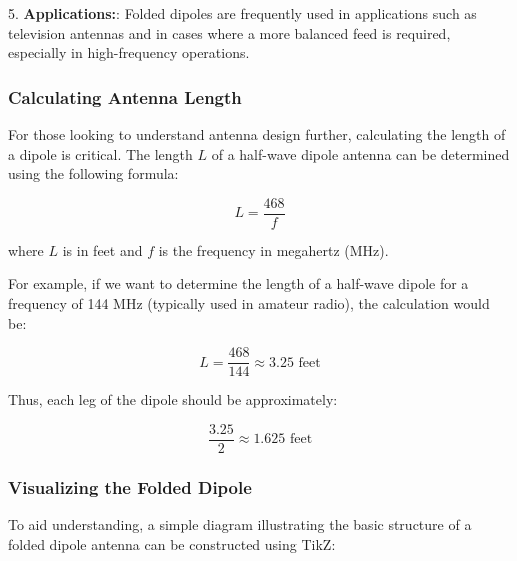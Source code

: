 5. \textbf{Applications:}: Folded dipoles are frequently used in applications such as television antennas and in cases where a more balanced feed is required, especially in high-frequency operations.

\subsubsection{Calculating Antenna Length}

For those looking to understand antenna design further, calculating the length of a dipole is critical. The length \( L \) of a half-wave dipole antenna can be determined using the following formula:

\[
L = \frac{468}{f}
\]

where \( L \) is in feet and \( f \) is the frequency in megahertz (MHz).

For example, if we want to determine the length of a half-wave dipole for a frequency of 144 MHz (typically used in amateur radio), the calculation would be:

\[
L = \frac{468}{144} \approx 3.25 \text{ feet}
\]

Thus, each leg of the dipole should be approximately:

\[
\frac{3.25}{2} \approx 1.625 \text{ feet}
\]

\subsubsection{Visualizing the Folded Dipole}

To aid understanding, a simple diagram illustrating the basic structure of a folded dipole antenna can be constructed using TikZ:

